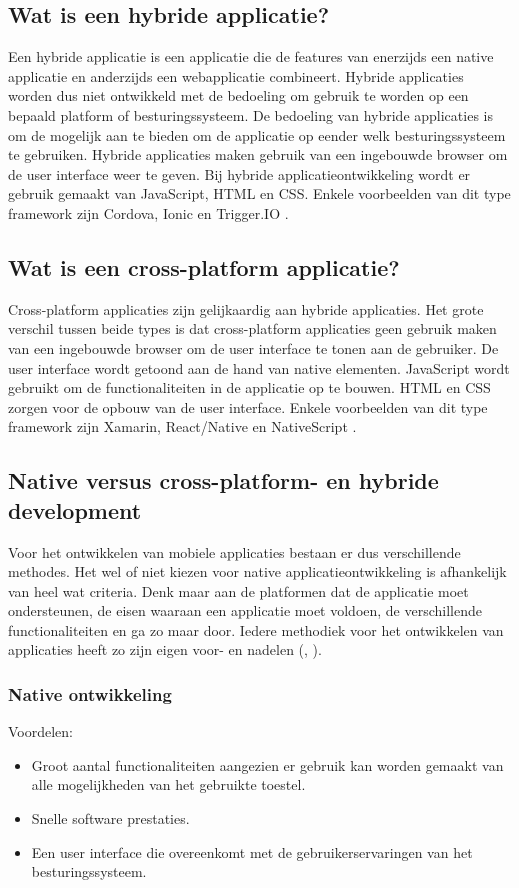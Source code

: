 \subsection{Wat is een hybride applicatie?}
Een hybride applicatie is een applicatie die de features van enerzijds een native applicatie en anderzijds een webapplicatie combineert. Hybride applicaties worden dus niet ontwikkeld met de bedoeling om gebruik te worden op een bepaald platform of besturingssysteem. De bedoeling van hybride applicaties is om de mogelijk aan te bieden om de applicatie op eender welk besturingssysteem te gebruiken. Hybride applicaties maken gebruik van een ingebouwde browser om de user interface weer te geven. Bij hybride applicatieontwikkeling wordt er gebruik gemaakt van JavaScript, HTML en CSS. Enkele voorbeelden van dit type framework zijn Cordova, Ionic en Trigger.IO \autocite{MeaningHybridApp}.

\subsection{Wat is een cross-platform applicatie?}
Cross-platform applicaties zijn gelijkaardig aan hybride applicaties. Het grote verschil tussen beide types is dat cross-platform applicaties geen gebruik maken van een ingebouwde browser om de user interface te tonen aan de gebruiker. De user interface wordt getoond aan de hand van native elementen. JavaScript wordt gebruikt om de functionaliteiten in de applicatie op te bouwen. HTML en CSS zorgen voor de opbouw van de user interface. Enkele voorbeelden van dit type framework zijn Xamarin, React/Native en NativeScript \autocite{NativeVsCross2}.

\subsection{Native versus cross-platform- en hybride development}
\label{sec:nativeversuscross}
Voor het ontwikkelen van mobiele applicaties bestaan er dus verschillende methodes. Het wel of niet kiezen voor native applicatieontwikkeling is afhankelijk van heel wat criteria. Denk maar aan de platformen dat de applicatie moet ondersteunen, de eisen waaraan een applicatie moet voldoen, de verschillende functionaliteiten en ga zo maar door. Iedere methodiek voor het ontwikkelen van applicaties heeft zo zijn eigen voor- en nadelen (\textcite{NativeVsCross2}, \textcite{NativeVsCross3}).

\subsubsection{Native ontwikkeling}
Voordelen:
\begin{itemize}
	\item Groot aantal functionaliteiten aangezien er gebruik kan worden gemaakt van alle mogelijkheden van het gebruikte toestel.
	\item Snelle software prestaties.
	\item Een user interface die overeenkomt met de gebruikerservaringen van het besturingssysteem.
\end{itemize}

